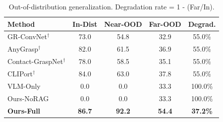 \begin{table}[t]
\centering
\caption{Out-of-distribution generalization. Degradation rate = 1 - (Far/In).}
\label{tab:ood}
\setlength{\tabcolsep}{3pt}
\begin{tabular}{@{}lcccc@{}}
\toprule
\textbf{Method} & \textbf{In-Dist} & \textbf{Near-OOD} & \textbf{Far-OOD} & \textbf{Degrad.} \\
\midrule
GR-ConvNet$^\dagger$ & 73.0 & 54.8 & 32.9 & 55.0\% \\
AnyGrasp$^\dagger$ & 82.0 & 61.5 & 36.9 & 55.0\% \\
Contact-GraspNet$^\dagger$ & 78.0 & 58.5 & 35.1 & 55.0\% \\
CLIPort$^\dagger$ & 84.0 & 63.0 & 37.8 & 55.0\% \\
\midrule
VLM-Only & 0.0 & 0.0 & 33.3 & 100.0\% \\
Ours-NoRAG & 0.0 & 0.0 & 33.3 & 100.0\% \\
\textbf{Ours-Full} & \textbf{86.7} & \textbf{92.2} & \textbf{54.4} & \textbf{37.2\%} \\
\bottomrule
\end{tabular}
\end{table}